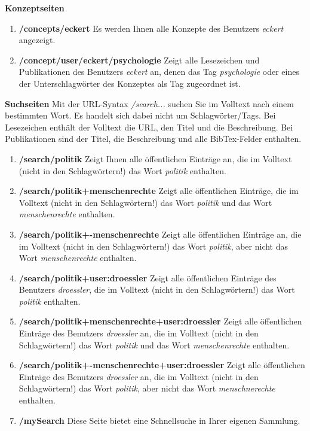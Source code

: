 \textbf{Konzeptseiten}
\begin{enumerate}
    \item \textbf{/concepts/eckert} \newline
    Es werden Ihnen alle Konzepte des Benutzers \textit{eckert} angezeigt.
    \item \textbf{/concept/user/eckert/psychologie} \newline
    Zeigt alle Lesezeichen und Publikationen des Benutzers \textit{eckert} an, denen das Tag \textit{psychologie} oder eines der Unterschlagwörter des Konzeptes als Tag zugeordnet ist. 
\end{enumerate}
\textbf{Suchseiten}\newline
Mit der URL-Syntax \textit{/search...} suchen Sie im Volltext nach einem bestimmten Wort. Es handelt sich dabei nicht um Schlagwörter/Tags. Bei Lesezeichen enthält der Volltext die URL, den Titel und die Beschreibung. Bei Publikationen sind der Titel, die Beschreibung und alle BibTex-Felder enthalten.
\begin{enumerate}
    \item \textbf{/search/politik} \newline
    Zeigt Ihnen alle öffentlichen Einträge an, die im Volltext (nicht in den Schlagwörtern!) das Wort \textit{politik} enthalten. 
    \item \textbf{/search/politik+menschenrechte}\newline
    Zeigt alle öffentlichen Einträge, die im Volltext (nicht in den Schlagwörtern!) das Wort \textit{politik} und das Wort \textit{menschenrechte} enthalten. 
    \item \textbf{/search/politik+-menschenrechte} \newline
    Zeigt alle öffentlichen Einträge an, die im Volltext (nicht in den Schlagwörtern!) das Wort \textit{politik}, aber nicht das Wort \textit{menschenrechte} enthalten. 
    \item \textbf{/search/politik+user:droessler} \newline
    Zeigt alle öffentlichen Einträge des Benutzers \textit{droessler}, die im Volltext (nicht in den Schlagwörtern!) das Wort \textit{politik} enthalten. 
    \item \textbf{/search/politik+menschenrechte+user:droessler}\newline
    Zeigt alle öffentlichen Einträge des Benutzers \textit{droessler} an, die im Volltext (nicht in den Schlagwörtern!) das Wort \textit{politik} und das Wort \textit{menschenrechte} enthalten. 
    \item \textbf{/search/politik+-menschenrechte+user:droessler} \newline
    Zeigt alle öffentlichen Einträge des Benutzers \textit{droessler} an, die im Volltext (nicht in den Schlagwörtern!) das Wort \textit{politik}, aber nicht das Wort \textit{menschnerechte} enthalten. 
    \item \textbf{/mySearch} \newline
    Diese Seite bietet eine Schnellsuche in Ihrer eigenen Sammlung.
\end{enumerate}
